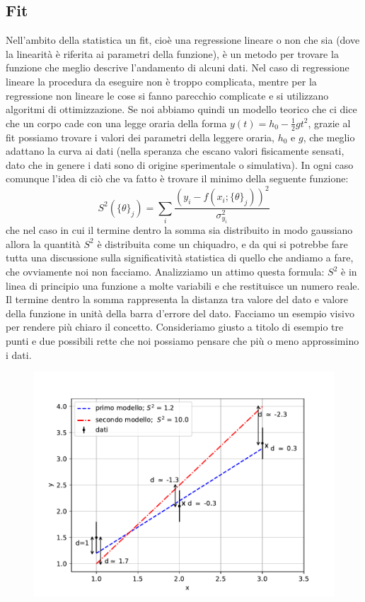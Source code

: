 \documentclass[10pt,a4paper]{article}
\begin{document}
\subsection{Fit}
Nell'ambito della statistica un fit, cioè una regressione lineare o non che sia (dove la linearità è riferita ai parametri della funzione), è un metodo per trovare la funzione che meglio descrive l'andamento di alcuni dati. Nel caso di regressione lineare la procedura da eseguire non è troppo complicata, mentre per la regressione non lineare le cose si fanno parecchio complicate e si utilizzano algoritmi di ottimizzazione.
Se noi abbiamo quindi un modello teorico che ci dice che un corpo cade con una legge oraria della forma $y(t) = h_0 - \frac{1}{2}gt^2$, grazie al fit possiamo trovare i valori dei parametri della leggere oraria, $h_0$ e $g$, che meglio adattano la curva ai dati (nella speranza che escano valori fisicamente sensati, dato che in genere i dati sono di origine sperimentale o simulativa).
In ogni caso comunque l'idea di ciò che va fatto è trovare il minimo della seguente funzione:
\begin{equation}\label{chisq}
S^2(\{ \theta \}_j ) = \sum_i \frac{(y_i - f(x_i; \{ \theta \}_j ))^2}{\sigma_{y_i}^2}
\end{equation}
che nel caso in cui il termine dentro la somma sia distribuito in modo gaussiano allora la quantità $S^2$ è distribuita come un chiquadro, e da qui si potrebbe fare tutta una discussione sulla significatività statistica di quello che andiamo a fare, che ovviamente noi non facciamo.
Analizziamo un attimo questa formula: $S^2$ è in linea di principio una funzione a molte variabili e che restituisce un numero reale. Il termine dentro la somma rappresenta la distanza tra valore del dato e valore della funzione in unità della barra d'errore del dato. Facciamo un esempio visivo per rendere più chiaro il concetto. Consideriamo giusto a titolo di esempio tre punti e due possibili rette che noi possiamo pensare che più o meno approssimino i dati.
\begin{figure}
\centering
\includegraphics[scale=0.8]{img/chisq_cfr.pdf}
\end{figure}
\end{document}
